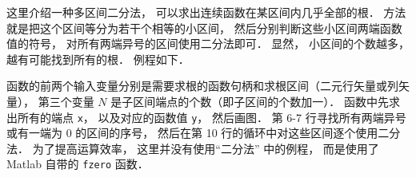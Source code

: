 

这里介绍一种多区间二分法， 可以求出连续函数在某区间内几乎全部的根． 方法就是把这个区间等分为若干个相等的小区间， 然后分别判断这些小区间两端函数值的符号， 对所有两端异号的区间使用二分法即可． 显然， 小区间的个数越多， 越有可能找到所有的根． 例程如下．


函数的前两个输入变量分别是需要求根的函数句柄和求根区间（二元行矢量或列矢量）， 第三个变量 $N$ 是子区间端点的个数（即子区间的个数加一）． 函数中先求出所有的端点 \lstinline|x|， 以及对应的函数值 \lstinline|y|， 然后画图． 第 6-7 行寻找所有两端异号或有一端为 0 的区间的序号， 然后在第 10 行的循环中对这些区间逐个使用二分法． 为了提高运算效率， 这里并没有使用“二分法” 中的例程， 而是使用了 Matlab 自带的 \lstinline|fzero| 函数．

